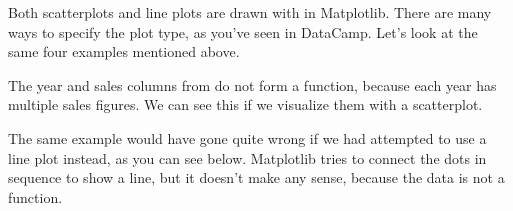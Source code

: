 \documentclass[letterpaper,10pt,english]{sphinxmanual}
\begin{document}
Both scatterplots and line plots are drawn with  in Matplotlib.  There are many ways to specify the plot type, as you’ve seen in DataCamp.  Let’s look at the same four examples mentioned above.

 The year and sales columns from  do not form a function, because each year has multiple sales figures.  We can see this if we visualize them with a scatterplot.

\begin{sphinxVerbatim}[commandchars=\\\{\}]
   
 \PYG{p}{[}\PYG{p}{]} \PYG{p}{[}\PYG{p}{]}   
      
  
  
\end{sphinxVerbatim}

\noindent{}

The same example would have gone quite wrong if we had attempted to use a line plot instead, as you can see below.  Matplotlib tries to connect the dots in sequence to show a line, but it doesn’t make any sense, because the data is not a function.
\end{document}
